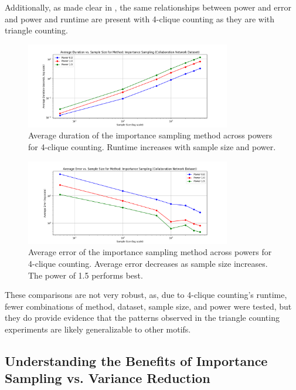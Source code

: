 \documentclass[11pt, margin=1in]{article}
\begin{document}
Additionally, as made clear in , the same relationships between power and error and power and runtime are present with 4-clique counting as they are with triangle counting.

\begin{figure}[H]
    \centering
    \includegraphics[width=0.8\textwidth]{plots/4-clique/importance-sampling/avg_duration_Importance Sampling.png}
    \caption{Average duration of the importance sampling method across powers for 4-clique counting. Runtime increases with sample size and power.}
    \label{fig:4_clique_avg_duration_importance_sampling}
\end{figure}

\begin{figure}[H]
    \centering
    \includegraphics[width=0.8\textwidth]{plots/4-clique/importance-sampling/avg_error_Importance Sampling.png}
    \caption{Average error of the importance sampling method across powers for 4-clique counting. Average error decreases as sample size increases. The power of 1.5 performs best.}
    \label{fig:4_clique_avg_error_importance_sampling}
\end{figure}

These comparisons are not very robust, as, due to 4-clique counting's runtime, fewer combinations of method, dataset, sample size, and power were tested, but they do provide evidence that the patterns observed in the triangle counting experiments are likely generalizable to other motifs.

\subsection{Understanding the Benefits of Importance Sampling vs. Variance Reduction}
\end{document}
